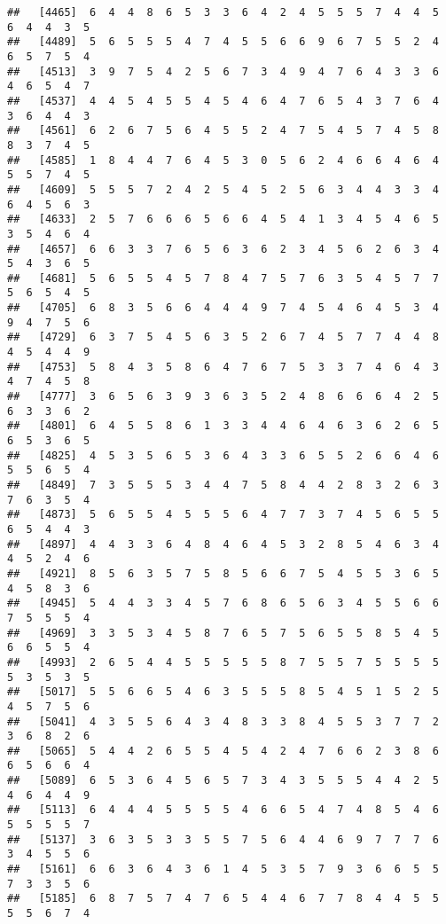 \documentclass[
]{book}
\begin{document}
\begin{verbatim}
##   [4465]  6  4  4  8  6  5  3  3  6  4  2  4  5  5  5  7  4  4  5  6  4  4  3  5
##   [4489]  5  6  5  5  5  4  7  4  5  5  6  6  9  6  7  5  5  2  4  6  5  7  5  4
##   [4513]  3  9  7  5  4  2  5  6  7  3  4  9  4  7  6  4  3  3  6  4  6  5  4  7
##   [4537]  4  4  5  4  5  5  4  5  4  6  4  7  6  5  4  3  7  6  4  3  6  4  4  3
##   [4561]  6  2  6  7  5  6  4  5  5  2  4  7  5  4  5  7  4  5  8  8  3  7  4  5
##   [4585]  1  8  4  4  7  6  4  5  3  0  5  6  2  4  6  6  4  6  4  5  5  7  4  5
##   [4609]  5  5  5  7  2  4  2  5  4  5  2  5  6  3  4  4  3  3  4  6  4  5  6  3
##   [4633]  2  5  7  6  6  6  5  6  6  4  5  4  1  3  4  5  4  6  5  3  5  4  6  4
##   [4657]  6  6  3  3  7  6  5  6  3  6  2  3  4  5  6  2  6  3  4  5  4  3  6  5
##   [4681]  5  6  5  5  4  5  7  8  4  7  5  7  6  3  5  4  5  7  7  5  6  5  4  5
##   [4705]  6  8  3  5  6  6  4  4  4  9  7  4  5  4  6  4  5  3  4  9  4  7  5  6
##   [4729]  6  3  7  5  4  5  6  3  5  2  6  7  4  5  7  7  4  4  8  4  5  4  4  9
##   [4753]  5  8  4  3  5  8  6  4  7  6  7  5  3  3  7  4  6  4  3  4  7  4  5  8
##   [4777]  3  6  5  6  3  9  3  6  3  5  2  4  8  6  6  6  4  2  5  6  3  3  6  2
##   [4801]  6  4  5  5  8  6  1  3  3  4  4  6  4  6  3  6  2  6  5  6  5  3  6  5
##   [4825]  4  5  3  5  6  5  3  6  4  3  3  6  5  5  2  6  6  4  6  5  5  6  5  4
##   [4849]  7  3  5  5  5  3  4  4  7  5  8  4  4  2  8  3  2  6  3  7  6  3  5  4
##   [4873]  5  6  5  5  4  5  5  5  6  4  7  7  3  7  4  5  6  5  5  6  5  4  4  3
##   [4897]  4  4  3  3  6  4  8  4  6  4  5  3  2  8  5  4  6  3  4  4  5  2  4  6
##   [4921]  8  5  6  3  5  7  5  8  5  6  6  7  5  4  5  5  3  6  5  4  5  8  3  6
##   [4945]  5  4  4  3  3  4  5  7  6  8  6  5  6  3  4  5  5  6  6  7  5  5  5  4
##   [4969]  3  3  5  3  4  5  8  7  6  5  7  5  6  5  5  8  5  4  5  6  6  5  5  4
##   [4993]  2  6  5  4  4  5  5  5  5  5  8  7  5  5  7  5  5  5  5  5  3  5  3  5
##   [5017]  5  5  6  6  5  4  6  3  5  5  5  8  5  4  5  1  5  2  5  4  5  7  5  6
##   [5041]  4  3  5  5  6  4  3  4  8  3  3  8  4  5  5  3  7  7  2  3  6  8  2  6
##   [5065]  5  4  4  2  6  5  5  4  5  4  2  4  7  6  6  2  3  8  6  6  5  6  6  4
##   [5089]  6  5  3  6  4  5  6  5  7  3  4  3  5  5  5  4  4  2  5  4  6  4  4  9
##   [5113]  6  4  4  4  5  5  5  5  4  6  6  5  4  7  4  8  5  4  6  5  5  5  5  7
##   [5137]  3  6  3  5  3  3  5  5  7  5  6  4  4  6  9  7  7  7  6  3  4  5  5  6
##   [5161]  6  6  3  6  4  3  6  1  4  5  3  5  7  9  3  6  6  5  5  7  3  3  5  6
##   [5185]  6  8  7  5  7  4  7  6  5  4  4  6  7  7  8  4  4  5  5  5  5  6  7  4

\end{verbatim}
\end{document}
